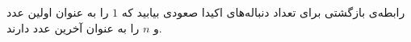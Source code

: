\EXERCISE
رابطه‌ی بازگشتی برای تعداد دنباله‌های اکیدا صعودی بیابید که
$1$
را به عنوان اولین عدد و
$n$
را به عنوان آخرین عدد دارند.